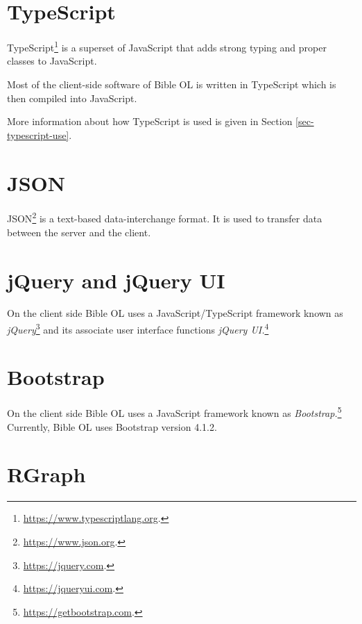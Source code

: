 \documentclass[11pt,oneside,a4paper]{memoir}
\begin{document}
\section{TypeScript}\label{sec-typescript}

TypeScript\footnote{\url{https://www.typescriptlang.org}.} is a superset of JavaScript that adds
strong typing and proper classes to JavaScript.

Most of the client-side software of Bible OL is written in TypeScript which is then compiled into
JavaScript.

More information about how TypeScript is used is given in Section
\ref{sec-typescript-use}.

\section{JSON}

JSON\footnote{\url{https://www.json.org}.} is a text-based data-interchange format. It is used to
transfer data between the server and the client.

\section{jQuery and jQuery UI}

On the client side Bible OL uses a JavaScript/TypeScript framework known as
\emph{jQuery}\footnote{\url{https://jquery.com}.} and its associate user interface functions
\emph{jQuery UI.}\footnote{\url{https://jqueryui.com}.}

\section{Bootstrap}

On the client side Bible OL uses a JavaScript framework known as
\emph{Bootstrap.}\footnote{\url{https://getbootstrap.com}.} Currently, Bible OL uses Bootstrap
version 4.1.2.

\section{RGraph}
\end{document}
